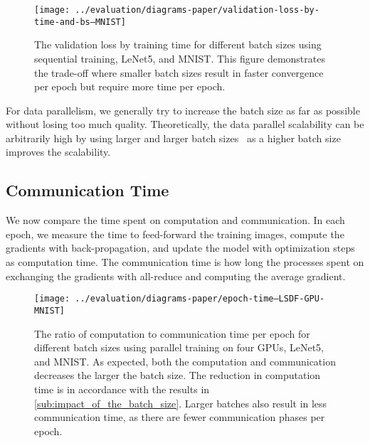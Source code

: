 \documentclass[conference]{IEEEtran}
\begin{document}
\begin{figure}[ht]
\centering
\texttt{[image: ../evaluation/diagrams-paper/validation-loss-by-time-and-bs--MNIST]}
\caption{The validation loss by training time for different batch sizes using sequential training, LeNet5, and MNIST.
This figure demonstrates the trade-off where smaller batch sizes result in faster convergence per epoch but require more time per epoch.}
\label{fig:loss_by_time}
\end{figure}

For data parallelism, we generally try to increase the batch size as far as possible without losing too much quality.
Theoretically, the data parallel scalability can be arbitrarily high by using larger and larger batch sizes~\cite{krizhevsky2014-One-weird-trick} as a higher batch size improves the scalability.


\subsection{Communication Time} %
\label{sub:communication_time}

We now compare the time spent on computation and communication.
In each epoch, we measure the time to feed-forward the training images, compute the gradients with back-propagation, and update the model with optimization steps as computation time.
The communication time is how long the processes spent on exchanging the gradients with all-reduce and computing the average gradient.

\begin{figure}[ht]
\centering
\texttt{[image: ../evaluation/diagrams-paper/epoch-time--LSDF-GPU-MNIST]}
\caption{The ratio of computation to communication time per epoch for different batch sizes using parallel training on four GPUs, LeNet5, and MNIST.
As expected, both the computation and communication decreases the larger the batch size.
The reduction in computation time is in accordance with the results in \autoref{sub:impact_of_the_batch_size}.
Larger batches also result in less communication time, as there are fewer communication phases per epoch.}
\label{fig:comm_time_by_batch_size}
\end{figure}
\end{document}
